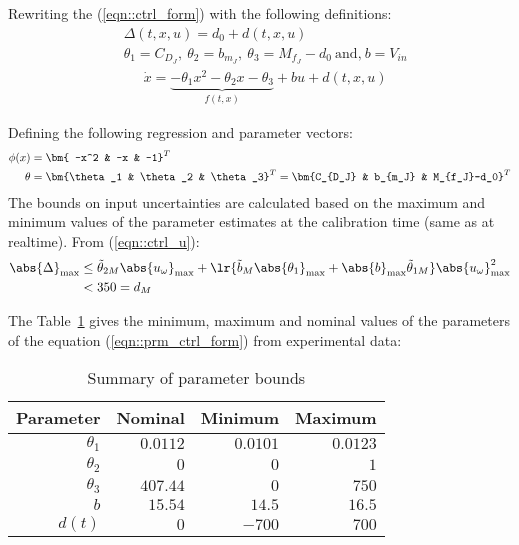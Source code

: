 Rewriting the (\ref{eqn::ctrl_form}) with the following definitions:
\begin{align*}
    &\Delta(t, x, u) = d_0 + d(t, x, u) \\
    & \theta_1 = C_{D_J}, \: \theta_2 = b_{m_J}, \: \theta_3 = M_{f_J} - d_0  \: \text{and,} \: b = V_{in}
\end{align*}
\begin{align}
    & \dot x = \underbrace{-\theta_1 x^2 -\theta_2 x - \theta_3}_{f(t, x)} + b u + d(t, x, u)
    \label{eqn::prm_ctrl_form}
\end{align}

Defining the following regression and parameter vectors:
\begin{align}
    \phi(x) &= \bm{ -x^2 & -x & -1}^T \\
    \theta &= \bm{\theta_1 & \theta_2 & \theta_3}^T = \bm{C_{D_J} & b_{m_J} & M_{f_J}-d_0}^T
\end{align}
The bounds on input
uncertainties are calculated based on the maximum and minimum values of the
parameter estimates at the calibration time (same as at realtime). From (\ref{eqn::ctrl_u}):
\begin{align*}
    \abs{\Delta}_{\max} &\leq \tilde \theta_{2M} \abs{u_\omega}_{\max} + \lr{\tilde b_M \abs{\theta_1}_{\max} + \abs{b}_{\max} \tilde \theta_{1M}}\abs{u_\omega}_{\max}^2  \\ &< 350 = d_M
\end{align*}

The Table~\ref{tab::parm_bounds} gives the minimum, maximum and nominal values
of the parameters of the equation (\ref{eqn::prm_ctrl_form}) from experimental
data:

\begin{table}[h]
    \caption{Summary of parameter bounds}
    \centering
    \begin{tabular}{r r r r}
        \hline \hline
        Parameter &Nominal & Minimum & Maximum \\ \hline
        $\theta_1$            &
        $0.0112$              &
        $0.0101$              &
        $0.0123$

        \\
        $\theta_2$               &
        $0$                      &
        $0$                      &
        $1$
        \\
        $\theta_3$                 &
        $407.44$                   &
        $0$                        &
        $750$
        \\
        $b$                        &
        $15.54$                    &
        $14.5$                     &
        $16.5$
        \\
        $d(t)$                   &
        $0$                      &
        $-700$                   &
        $700$
        \\
        \hline \hline
    \end{tabular}
    \label{tab::parm_bounds}
\end{table}
